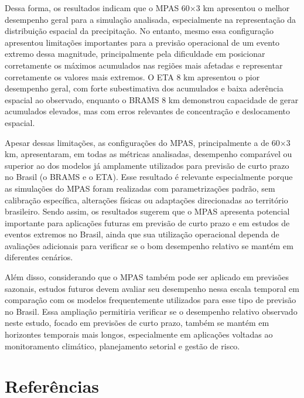 \documentclass[12pt,a4paper,oneside]{book}
\begin{document}
Dessa forma, os resultados indicam que o MPAS 60$\times$3 km apresentou o melhor desempenho geral para a simulação analisada, especialmente na representação da distribuição espacial da precipitação. No entanto, mesmo essa configuração apresentou limitações importantes para a previsão operacional de um evento extremo dessa magnitude, principalmente pela dificuldade em posicionar corretamente os máximos acumulados nas regiões mais afetadas e representar corretamente os valores mais extremos. O ETA 8 km apresentou o pior desempenho geral, com forte subestimativa dos acumulados e baixa aderência espacial ao observado, enquanto o BRAMS 8 km demonstrou capacidade de gerar acumulados elevados, mas com erros relevantes de concentração e deslocamento espacial.

Apesar dessas limitações, as configurações do MPAS, principalmente a de 60$\times$3 km, apresentaram, em todas as métricas analisadas, desempenho comparável ou superior ao dos modelos já amplamente utilizados para previsão de curto prazo no Brasil (o BRAMS e o ETA). Esse resultado é relevante especialmente porque as simulações do MPAS foram realizadas com parametrizações padrão, sem calibração específica, alterações físicas ou adaptações direcionadas ao território brasileiro. Sendo assim, os resultados sugerem que o MPAS apresenta potencial importante para aplicações futuras em previsão de curto prazo e em estudos de eventos extremos no Brasil, ainda que sua utilização operacional dependa de avaliações adicionais para verificar se o bom desempenho relativo se mantém em diferentes cenários.

Além disso, considerando que o MPAS também pode ser aplicado em previsões sazonais, estudos futuros devem avaliar seu desempenho nessa escala temporal em comparação com os modelos frequentemente utilizados para esse tipo de previsão no Brasil. Essa ampliação permitiria verificar se o desempenho relativo observado neste estudo, focado em previsões de curto prazo, também se mantém em horizontes temporais mais longos, especialmente em aplicações voltadas ao monitoramento climático, planejamento setorial e gestão de risco.

\chapter*{Referências}
\end{document}
